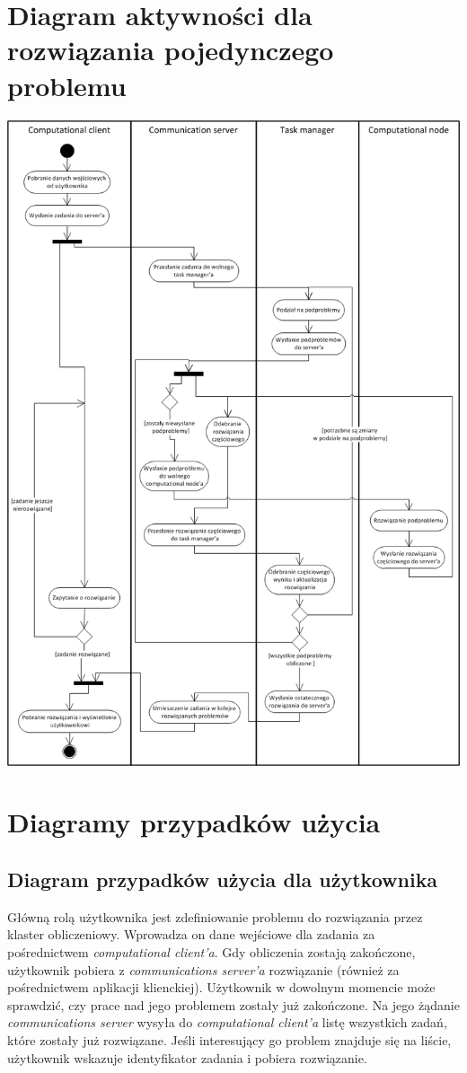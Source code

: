 \documentclass[12pt,a4paper,titlepage]{report}
\begin{document}
	\section{Diagram aktywności dla rozwiązania pojedynczego problemu}
	\includegraphics[width=\textwidth]{img/activityDiagram.png}
	
	\section{Diagramy przypadków użycia}	
	\subsection{Diagram przypadków użycia dla użytkownika}
	Główną rolą użytkownika jest zdefiniowanie problemu do rozwiązania przez klaster obliczeniowy. Wprowadza on dane wejściowe dla zadania za pośrednictwem \emph{computational client'a}. Gdy obliczenia zostają zakończone, użytkownik pobiera z \emph{communications server'a} rozwiązanie (również za pośrednictwem aplikacji klienckiej). Użytkownik w dowolnym momencie może sprawdzić, czy prace nad jego problemem zostały już zakończone. Na jego żądanie \emph{communications server} wysyła do \emph{computational client'a} listę wszystkich zadań, które zostały już rozwiązane. Jeśli interesujący go problem znajduje się na liście, użytkownik wskazuje identyfikator zadania i pobiera rozwiązanie.\\
	
\end{document}
